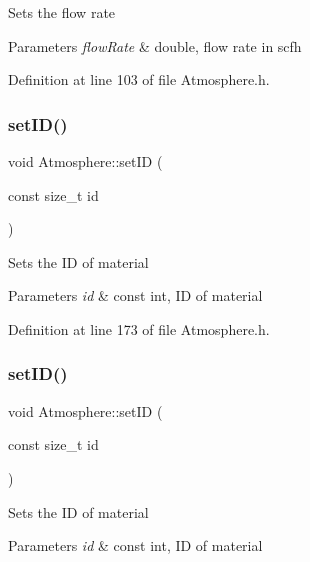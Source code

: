 Sets the flow rate 
\begin{DoxyParams}{Parameters}
{\em flow\+Rate} & double, flow rate in scfh \\
\hline
\end{DoxyParams}


Definition at line 103 of file Atmosphere.\+h.

\mbox{\label{class_atmosphere_a156e09f05336057be5591146948f6046}} 
\subsubsection{\texorpdfstring{set\+I\+D()}{setID()}\hspace{0.1cm}{\footnotesize\ttfamily [1/3]}}
{\footnotesize\ttfamily void Atmosphere\+::set\+ID (\begin{DoxyParamCaption}\item[{const size\+\_\+t}]{id }\end{DoxyParamCaption})\hspace{0.3cm}{\ttfamily [inline]}}

Sets the ID of material 
\begin{DoxyParams}{Parameters}
{\em id} & const int, ID of material \\
\hline
\end{DoxyParams}


Definition at line 173 of file Atmosphere.\+h.

\mbox{\label{class_atmosphere_a156e09f05336057be5591146948f6046}} 
\subsubsection{\texorpdfstring{set\+I\+D()}{setID()}\hspace{0.1cm}{\footnotesize\ttfamily [2/3]}}
{\footnotesize\ttfamily void Atmosphere\+::set\+ID (\begin{DoxyParamCaption}\item[{const size\+\_\+t}]{id }\end{DoxyParamCaption})\hspace{0.3cm}{\ttfamily [inline]}}

Sets the ID of material 
\begin{DoxyParams}{Parameters}
{\em id} & const int, ID of material \\
\hline
\end{DoxyParams}


